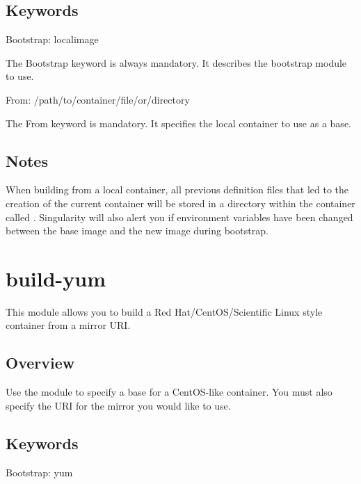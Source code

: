 \documentclass[letterpaper,10pt,english]{sphinxmanual}
\begin{document}
\subsection{Keywords}
\label{\detokenize{appendix:id8}}
%
\begin{sphinxVerbatim}[commandchars=\\\{\}]
Bootstrap: localimage
\end{sphinxVerbatim}

The Bootstrap keyword is always mandatory. It describes the bootstrap module to use.

%
\begin{sphinxVerbatim}[commandchars=\\\{\}]
From: /path/to/container/file/or/directory
\end{sphinxVerbatim}

The From keyword is mandatory. It specifies the local container to use as a base.


\subsection{Notes}
\label{\detokenize{appendix:id9}}
When building from a local container, all previous definition files that led to the creation of the current container will be stored in a
directory within the container called . Singularity will also alert you if environment variables have been
changed between the base image and the new image during bootstrap.


\section{build-yum}
\label{\detokenize{appendix:build-yum}}\label{\detokenize{appendix:id10}}\label{\detokenize{appendix:sec-build-yum}}
This module allows you to build a Red Hat/CentOS/Scientific Linux style container from a mirror URI.


\subsection{Overview}
\label{\detokenize{appendix:id11}}
Use the  module to specify a base for a CentOS-like container. You must also specify the URI for the mirror you would like to use.


\subsection{Keywords}
\label{\detokenize{appendix:id12}}
%
\begin{sphinxVerbatim}[commandchars=\\\{\}]
Bootstrap: yum
\end{sphinxVerbatim}
\end{document}
